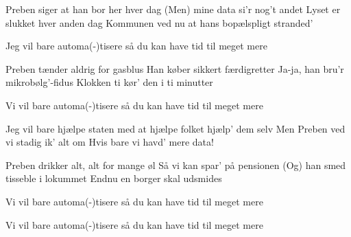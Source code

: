 \documentclass[a4paper,11pt]{article}
\begin{document}
\begin{song}

%
Preben siger at han bor her hver dag
(Men) mine data si'r nog't andet
Lyset er slukket hver anden dag
Kommunen ved nu at hans bopælspligt stranded'


%
Jeg vil bare automa(-)tisere
så du kan have tid til meget mere


%
Preben tænder aldrig for gasblus
Han køber sikkert færdigretter
%
Ja-ja, han bru'r mikrobølg'-fidus
Klokken ti kør' den i ti minutter


%
Vi vil bare automa(-)tisere
så du kan have tid til meget mere


%
Jeg vil bare hjælpe staten
med at hjælpe folket hjælp' dem selv
Men Preben ved vi stadig ik' alt om
%
Hvis bare vi havd' mere data!



 Preben drikker alt, alt for mange øl
 Så vi kan spar' på pensionen
 (Og) han smed tisseble i lokummet
 Endnu en borger skal udsmides


%
Vi vil bare automa(-)tisere
så du kan have tid til meget mere

Vi vil bare automa(-)tisere
så du kan have tid til meget mere


\end{song}
\end{document}
